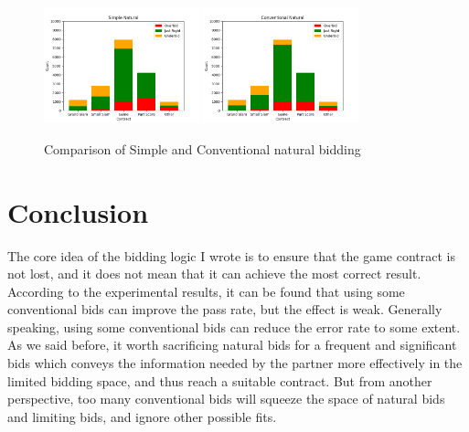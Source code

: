 \documentclass[11pt]{article}
\begin{document}
\begin{figure}
    \centering
    \includegraphics[width=0.4\textwidth]{Figure_1}
    \includegraphics[width=0.4\textwidth]{Figure_2}
    \caption{Comparison of Simple and Conventional natural bidding}
    \label{fig:my_label}
\end{figure}

\section{Conclusion}
The core idea of the bidding logic I wrote is to ensure that the game contract is not lost, and it does not mean that it can achieve the most correct result. According to the experimental results, it can be found that using some conventional bids can improve the pass rate, but the effect is weak. Generally speaking, using some conventional bids can reduce the error rate to some extent. As we said before, it worth sacrificing natural bids for a frequent and significant bids which  conveys the information needed by the partner more effectively in the limited bidding space, and thus reach a suitable contract. But from another perspective, too many conventional bids will squeeze the space of natural bids and limiting bids, and ignore other possible fits. 
\end{document}
